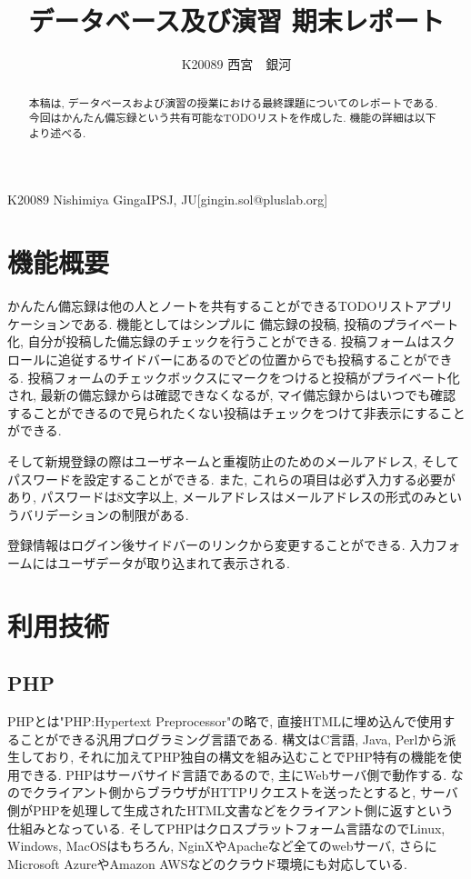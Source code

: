 \documentclass[submit,techrep]{ipsj}
\begin{document}

\title{データベース及び演習 期末レポート\\}

\author{K20089 西宮　銀河}{K20089 Nishimiya Ginga}{IPSJ, JU}[gingin.sol@pluslab.org]

\begin{abstract}
本稿は, データベースおよび演習の授業における最終課題についてのレポートである. 
今回はかんたん備忘録という共有可能なTODOリストを作成した. 機能の詳細は以下より述べる.
\end{abstract}

\maketitle

\section{機能概要}
かんたん備忘録は他の人とノートを共有することができるTODOリストアプリケーションである. 機能としてはシンプルに
備忘録の投稿, 投稿のプライベート化, 自分が投稿した備忘録のチェックを行うことができる. 投稿フォームはスクロールに追従するサイドバーにあるのでどの位置からでも投稿することができる. 
投稿フォームのチェックボックスにマークをつけると投稿がプライベート化され, 最新の備忘録からは確認できなくなるが, マイ備忘録からはいつでも確認することができるので見られたくない投稿はチェックをつけて非表示にすることができる. 

そして新規登録の際はユーザネームと重複防止のためのメールアドレス, そしてパスワードを設定することができる. 
また, これらの項目は必ず入力する必要があり, パスワードは8文字以上, メールアドレスはメールアドレスの形式のみというバリデーションの制限がある. 

登録情報はログイン後サイドバーのリンクから変更することができる. 入力フォームにはユーザデータが取り込まれて表示される.


\section{利用技術}

\subsection{PHP}
PHPとは"PHP:Hypertext Preprocessor"の略で, 直接HTMLに埋め込んで使用することができる汎用プログラミング言語である. 
構文はC言語, Java, Perlから派生しており, それに加えてPHP独自の構文を組み込むことでPHP特有の機能を使用できる. 
PHPはサーバサイド言語であるので, 主にWebサーバ側で動作する. 
なのでクライアント側からブラウザがHTTPリクエストを送ったとすると, サーバ側がPHPを処理して生成されたHTML文書などをクライアント側に返すという仕組みとなっている. 
そしてPHPはクロスプラットフォーム言語なのでLinux, Windows, MacOSはもちろん, NginXやApacheなど全てのwebサーバ, さらにMicrosoft AzureやAmazon AWSなどのクラウド環境にも対応している. 
\end{document}
